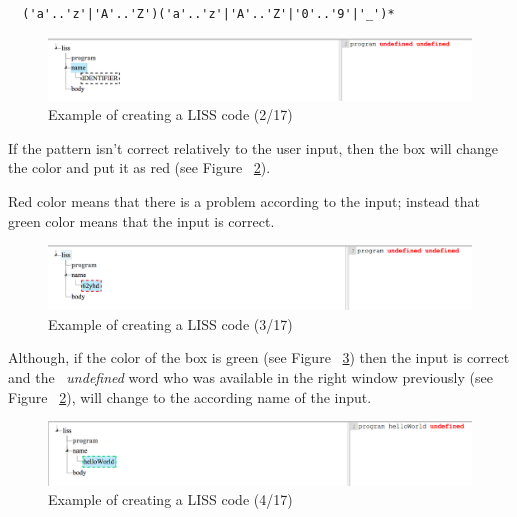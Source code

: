 \documentclass[
  oneside,
  11pt, a4paper,
  footinclude=true,
  headinclude=true,
  cleardoublepage=empty
]{scrbook}
\begin{document}
\begin{lstlisting}
  ('a'..'z'|'A'..'Z')('a'..'z'|'A'..'Z'|'0'..'9'|'_')*
\end{lstlisting}

\begin{figure}[h!]
  \centering
    \includegraphics[width=1\textwidth]{img/LISS-SDE_creating_program/LISS-SDE2.png}
    \caption{Example of creating a LISS code (2/17)}
    \label{fig:LISS-SDE_example_2}
\end{figure}

If the pattern isn't correct relatively to the user input, then the box will change the color and put it as red (see Figure ~\ref{fig:LISS-SDE_example_3}).

Red color means that there is a problem according to the input; instead that green color means that the input is correct.

\begin{figure}[h!]
  \centering
    \includegraphics[width=1\textwidth]{img/LISS-SDE_creating_program/LISS-SDE3.png}
    \caption{Example of creating a LISS code (3/17)}
    \label{fig:LISS-SDE_example_3}
\end{figure}

Although, if the color of the box is green (see Figure ~\ref{fig:LISS-SDE_example_4}) then the input is correct and the ~\textit{undefined} word who was available in the right window previously (see Figure ~\ref{fig:LISS-SDE_example_3}), will change to the according name of the input.

\begin{figure}[h!]
  \centering
    \includegraphics[width=1\textwidth]{img/LISS-SDE_creating_program/LISS-SDE4.png}
    \caption{Example of creating a LISS code (4/17)}
    \label{fig:LISS-SDE_example_4}
\end{figure}
\end{document}
